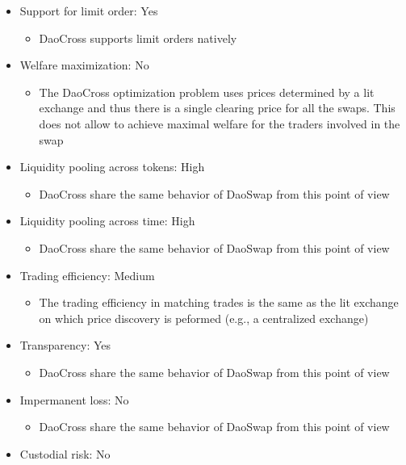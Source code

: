 \documentclass[11pt, reqno]{amsart}
\theoremstyle{definition}
\theoremstyle{remark}
\begin{document}
\begin{itemize}
	\item Support for limit order: Yes
	      \begin{itemize}
		      \item DaoCross supports limit orders natively
	      \end{itemize}
	\item Welfare maximization: No
	      \begin{itemize}
		      \item The DaoCross optimization problem uses prices determined by
                a lit exchange and thus there is a single clearing price for all
                the swaps. This does not allow to achieve maximal welfare for
                the traders involved in the swap
	      \end{itemize}
	\item Liquidity pooling across tokens: High
	      \begin{itemize}
		      \item DaoCross share the same behavior of DaoSwap from this point of view
	      \end{itemize}
	\item Liquidity pooling across time: High
	      \begin{itemize}
		      \item DaoCross share the same behavior of DaoSwap from this point of view
	      \end{itemize}
	\item Trading efficiency: Medium
	      \begin{itemize}
              \item The trading efficiency in matching trades is the same as the
                lit exchange on which price discovery is peformed (e.g., a
                centralized exchange)
	      \end{itemize}
	\item Transparency: Yes
	      \begin{itemize}
		      \item DaoCross share the same behavior of DaoSwap from this point of view
	      \end{itemize}
	\item Impermanent loss: No
	      \begin{itemize}
		      \item DaoCross share the same behavior of DaoSwap from this point of view
	      \end{itemize}
	\item Custodial risk: No

\end{itemize}
\end{document}
